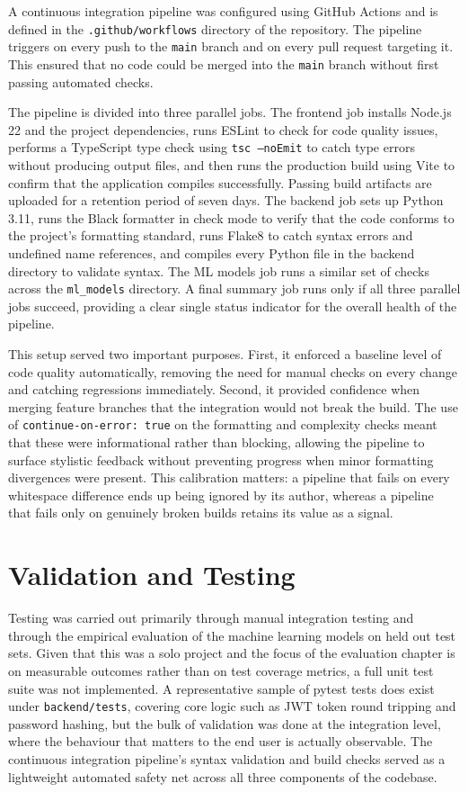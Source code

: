 A continuous integration pipeline was configured using GitHub Actions
\cite{githubactions2025} and is defined in the \texttt{.github/workflows}
directory of the repository. The pipeline triggers on every push to the \texttt{main} branch and on every pull request targeting it. This ensured that no code could be merged into the \texttt{main} branch without first passing automated checks.

The pipeline is divided into three parallel jobs. The frontend job
installs Node.js 22 and the project dependencies, runs ESLint to check
for code quality issues, performs a TypeScript type check using
\texttt{tsc --noEmit} to catch type errors without producing output files,
and then runs the production build using Vite \cite{vite2025} to confirm
that the application compiles successfully. Passing build artifacts are
uploaded for a retention period of seven days. The backend job sets up
Python 3.11, runs the Black formatter in check mode to verify that the
code conforms to the project's formatting standard, runs Flake8 to catch
syntax errors and undefined name references, and compiles every Python
file in the backend directory to validate syntax. The ML models job runs
a similar set of checks across the \texttt{ml\_models} directory. A final
summary job runs only if all three parallel jobs succeed, providing a
clear single status indicator for the overall health of the pipeline.

This setup served two important purposes. First, it enforced a baseline
level of code quality automatically, removing the need for manual checks
on every change and catching regressions immediately. Second, it provided
confidence when merging feature branches that the integration would not
break the build. The use of \texttt{continue-on-error: true} on the
formatting and complexity checks meant that these were informational
rather than blocking, allowing the pipeline to surface stylistic feedback
without preventing progress when minor formatting divergences were present.
This calibration matters: a pipeline that fails on every whitespace
difference ends up being ignored by its author, whereas a pipeline that
fails only on genuinely broken builds retains its value as a signal.

\section{Validation and Testing}

Testing was carried out primarily through manual integration testing and
through the empirical evaluation of the machine learning models on held
out test sets. Given that this was a solo project and the focus of the
evaluation chapter is on measurable outcomes rather than on test coverage
metrics, a full unit test suite was not implemented. A representative
sample of pytest tests does exist under \texttt{backend/tests}, covering
core logic such as JWT token round tripping and password hashing, but the
bulk of validation was done at the integration level, where the behaviour
that matters to the end user is actually observable. The continuous
integration pipeline's syntax validation and build checks served as a
lightweight automated safety net across all three components of the
codebase.

